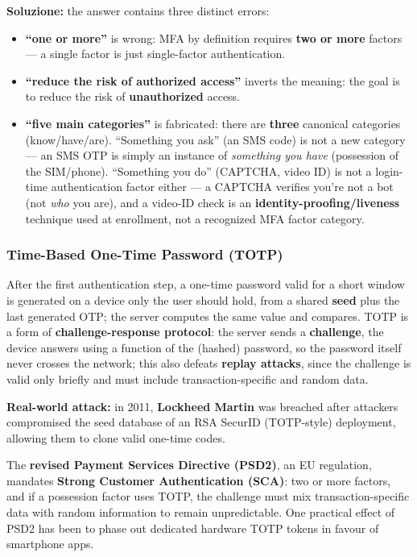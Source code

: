 \documentclass[12pt, a4paper]{article}
\begin{document}
\textbf{Soluzione:} the answer contains three distinct errors:
\begin{itemize}
    \item \textbf{``one or more''} is wrong: MFA by definition requires \textbf{two or more} factors — a single factor is just single-factor authentication.
    \item \textbf{``reduce the risk of authorized access''} inverts the meaning: the goal is to reduce the risk of \textbf{unauthorized} access.
    \item \textbf{``five main categories''} is fabricated: there are \textbf{three} canonical categories (know/have/are). ``Something you ask'' (an SMS code) is not a new category — an SMS OTP is simply an instance of \emph{something you have} (possession of the SIM/phone). ``Something you do'' (CAPTCHA, video ID) is not a login-time authentication factor either — a CAPTCHA verifies you're not a bot (not \emph{who} you are), and a video-ID check is an \textbf{identity-proofing/liveness} technique used at enrollment, not a recognized MFA factor category.
\end{itemize}

\subsubsection{Time-Based One-Time Password (TOTP)}
After the first authentication step, a one-time password valid for a short window is generated on a device only the user should hold, from a shared \textbf{seed} plus the last generated OTP; the server computes the same value and compares. TOTP is a form of \textbf{challenge-response protocol}: the server sends a \textbf{challenge}, the device answers using a function of the (hashed) password, so the password itself never crosses the network; this also defeats \textbf{replay attacks}, since the challenge is valid only briefly and must include transaction-specific and random data.

\textcolor{blue!50!black}{\textbf{Real-world attack:}} in 2011, \textbf{Lockheed Martin} was breached after attackers compromised the seed database of an RSA SecurID (TOTP-style) deployment, allowing them to clone valid one-time codes.

The \textbf{revised Payment Services Directive (PSD2)}, an EU regulation, mandates \textbf{Strong Customer Authentication (SCA)}: two or more factors, and if a possession factor uses TOTP, the challenge must mix transaction-specific data with random information to remain unpredictable. One practical effect of PSD2 has been to phase out dedicated hardware TOTP tokens in favour of smartphone apps.
\end{document}
